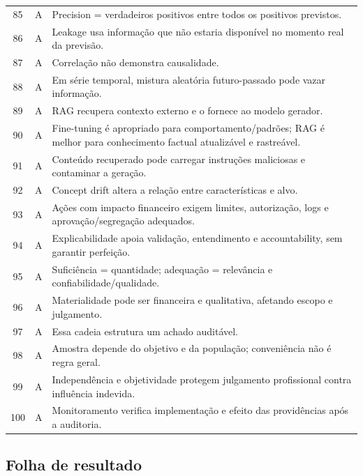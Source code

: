 \begin{longtable}{c c p{10.8cm}}
85 & A & Precision = verdadeiros positivos entre todos os positivos previstos. \\
86 & A & Leakage usa informação que não estaria disponível no momento real da previsão. \\
87 & A & Correlação não demonstra causalidade. \\
88 & A & Em série temporal, mistura aleatória futuro-passado pode vazar informação. \\
89 & A & RAG recupera contexto externo e o fornece ao modelo gerador. \\
90 & A & Fine-tuning é apropriado para comportamento/padrões; RAG é melhor para conhecimento factual atualizável e rastreável. \\
91 & A & Conteúdo recuperado pode carregar instruções maliciosas e contaminar a geração. \\
92 & A & Concept drift altera a relação entre características e alvo. \\
93 & A & Ações com impacto financeiro exigem limites, autorização, logs e aprovação/segregação adequados. \\
94 & A & Explicabilidade apoia validação, entendimento e accountability, sem garantir perfeição. \\
95 & A & Suficiência = quantidade; adequação = relevância e confiabilidade/qualidade. \\
96 & A & Materialidade pode ser financeira e qualitativa, afetando escopo e julgamento. \\
97 & A & Essa cadeia estrutura um achado auditável. \\
98 & A & Amostra depende do objetivo e da população; conveniência não é regra geral. \\
99 & A & Independência e objetividade protegem julgamento profissional contra influência indevida. \\
100 & A & Monitoramento verifica implementação e efeito das providências após a auditoria. \\
\bottomrule
\end{longtable}

\subsection*{Folha de resultado}

